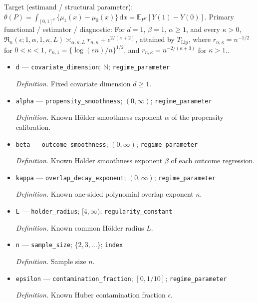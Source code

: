 \documentclass{article}
\begin{document}
Target (estimand / structural parameter): \(\theta(P)=\int_{[0,1]^d}\{\mu_1(x)-\mu_0(x)\}\,\mathrm dx=\mathbb E_{P^{\mathrm F}}[Y(1)-Y(0)]\).
Primary functional / estimator / diagnostic: For \(d=1\), \(\beta=1\), \(\alpha\geq1\), and every \(\kappa>0\), \(\mathfrak R_n(\epsilon;1,\alpha,1,\kappa,L)\asymp_{\alpha,\kappa,L}r_{n,\kappa}+\epsilon^{2/(\kappa+2)}\), attained by \(T_{\mathrm{Lip}}\), where \(r_{n,\kappa}=n^{-1/2}\) for \(0<\kappa<1\), \(r_{n,1}=\{\log(en)/n\}^{1/2}\), and \(r_{n,\kappa}=n^{-2/(\kappa+3)}\) for \(\kappa>1\)..
\begin{itemize}
  \item \texttt{d} --- \texttt{covariate\_\allowbreak{}dimension}; \(\mathbb N\); \texttt{regime\_\allowbreak{}parameter}
  \par\smallskip\noindent\emph{Definition.} Fixed covariate dimension \(d\geq 1\).
  \item \texttt{alpha} --- \texttt{propensity\_\allowbreak{}smoothness}; \((0,\infty)\); \texttt{regime\_\allowbreak{}parameter}
  \par\smallskip\noindent\emph{Definition.} Known Hölder smoothness exponent \(\alpha\) of the propensity calibration.
  \item \texttt{beta} --- \texttt{outcome\_\allowbreak{}smoothness}; \((0,\infty)\); \texttt{regime\_\allowbreak{}parameter}
  \par\smallskip\noindent\emph{Definition.} Known Hölder smoothness exponent \(\beta\) of each outcome regression.
  \item \texttt{kappa} --- \texttt{overlap\_\allowbreak{}decay\_\allowbreak{}exponent}; \((0,\infty)\); \texttt{regime\_\allowbreak{}parameter}
  \par\smallskip\noindent\emph{Definition.} Known one-sided polynomial overlap exponent \(\kappa\).
  \item \texttt{L} --- \texttt{holder\_\allowbreak{}radius}; \([4,\infty)\); \texttt{regularity\_\allowbreak{}constant}
  \par\smallskip\noindent\emph{Definition.} Known common Hölder radius \(L\).
  \item \texttt{n} --- \texttt{sample\_\allowbreak{}size}; \(\{2,3,\ldots\}\); \texttt{index}
  \par\smallskip\noindent\emph{Definition.} Sample size \(n\).
  \item \texttt{epsilon} --- \texttt{contamination\_\allowbreak{}fraction}; \([0,1/10]\); \texttt{regime\_\allowbreak{}parameter}
  \par\smallskip\noindent\emph{Definition.} Known Huber contamination fraction \(\epsilon\).

\end{itemize}
\end{document}
